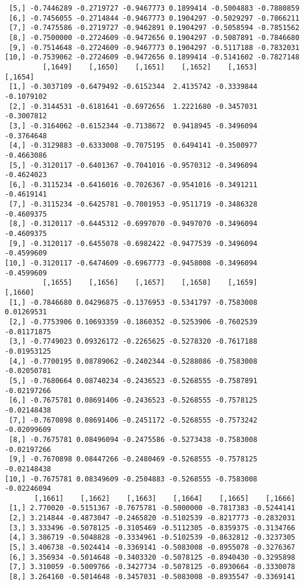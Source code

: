 \documentclass[
  letterpaper,
  DIV=11,
  numbers=noendperiod]{scrreprt}
\begin{document}
\begin{verbatim}
 [5,] -0.7446289 -0.2719727 -0.9467773 0.1899414 -0.5004883 -0.7880859
 [6,] -0.7456055 -0.2714844 -0.9467773 0.1904297 -0.5029297 -0.7866211
 [7,] -0.7475586 -0.2719727 -0.9462891 0.1904297 -0.5058594 -0.7851562
 [8,] -0.7500000 -0.2724609 -0.9472656 0.1904297 -0.5087891 -0.7846680
 [9,] -0.7514648 -0.2724609 -0.9467773 0.1904297 -0.5117188 -0.7832031
[10,] -0.7539062 -0.2724609 -0.9472656 0.1899414 -0.5141602 -0.7827148
         [,1649]    [,1650]    [,1651]    [,1652]    [,1653]    [,1654]
 [1,] -0.3037109 -0.6479492 -0.6152344  2.4135742 -0.3339844 -0.1079102
 [2,] -0.3144531 -0.6181641 -0.6972656  1.2221680 -0.3457031 -0.3007812
 [3,] -0.3164062 -0.6152344 -0.7138672  0.9418945 -0.3496094 -0.3764648
 [4,] -0.3129883 -0.6333008 -0.7075195  0.6494141 -0.3500977 -0.4663086
 [5,] -0.3120117 -0.6401367 -0.7041016 -0.9570312 -0.3496094 -0.4624023
 [6,] -0.3115234 -0.6416016 -0.7026367 -0.9541016 -0.3491211 -0.4619141
 [7,] -0.3115234 -0.6425781 -0.7001953 -0.9511719 -0.3486328 -0.4609375
 [8,] -0.3120117 -0.6445312 -0.6997070 -0.9497070 -0.3496094 -0.4609375
 [9,] -0.3120117 -0.6455078 -0.6982422 -0.9477539 -0.3496094 -0.4599609
[10,] -0.3120117 -0.6474609 -0.6967773 -0.9458008 -0.3496094 -0.4599609
         [,1655]    [,1656]    [,1657]    [,1658]    [,1659]     [,1660]
 [1,] -0.7846680 0.04296875 -0.1376953 -0.5341797 -0.7583008  0.01269531
 [2,] -0.7753906 0.10693359 -0.1860352 -0.5253906 -0.7602539 -0.01171875
 [3,] -0.7749023 0.09326172 -0.2265625 -0.5278320 -0.7617188 -0.01953125
 [4,] -0.7700195 0.08789062 -0.2402344 -0.5288086 -0.7583008 -0.02050781
 [5,] -0.7680664 0.08740234 -0.2436523 -0.5268555 -0.7587891 -0.02197266
 [6,] -0.7675781 0.08691406 -0.2436523 -0.5268555 -0.7578125 -0.02148438
 [7,] -0.7670898 0.08691406 -0.2451172 -0.5268555 -0.7573242 -0.02099609
 [8,] -0.7675781 0.08496094 -0.2475586 -0.5273438 -0.7583008 -0.02197266
 [9,] -0.7670898 0.08447266 -0.2480469 -0.5268555 -0.7578125 -0.02148438
[10,] -0.7675781 0.08349609 -0.2504883 -0.5268555 -0.7583008 -0.02246094
       [,1661]    [,1662]    [,1663]    [,1664]    [,1665]    [,1666]
 [1,] 2.770020 -0.5151367 -0.7675781 -0.5000000 -0.7817383 -0.5244141
 [2,] 3.214844 -0.4873047 -0.2465820 -0.5102539 -0.8217773 -0.2832031
 [3,] 3.333496 -0.5078125 -0.3105469 -0.5112305 -0.8359375 -0.3134766
 [4,] 3.386719 -0.5048828 -0.3334961 -0.5102539 -0.8632812 -0.3237305
 [5,] 3.406738 -0.5024414 -0.3369141 -0.5083008 -0.8955078 -0.3276367
 [6,] 3.356934 -0.5014648 -0.3403320 -0.5078125 -0.8940430 -0.3295898
 [7,] 3.310059 -0.5009766 -0.3427734 -0.5078125 -0.8930664 -0.3330078
 [8,] 3.264160 -0.5014648 -0.3457031 -0.5083008 -0.8935547 -0.3369141

\end{verbatim}
\end{document}
